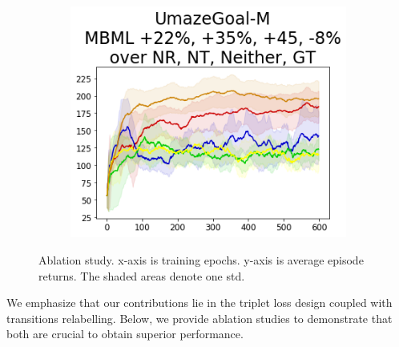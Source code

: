 \begin{figure}[!t]
\begin{minipage}{0.70\textwidth}
{            \begin{subfigure}{\mujocobaselinefigsize\paperwidth}
                \includegraphics[width=\linewidth]{chapter_2/fig/wd-ablation-UmazeGoal-M.png}
            \end{subfigure}}

    \end{minipage}

    \caption{Ablation study.
        x-axis is training epochs.
        y-axis is average episode returns.
        The shaded areas denote one std.
    }\label{fig:ablation}
\end{figure}

We emphasize that our contributions lie in the triplet loss design coupled with transitions relabelling. Below, we provide ablation studies to demonstrate that both are crucial to obtain superior performance.

